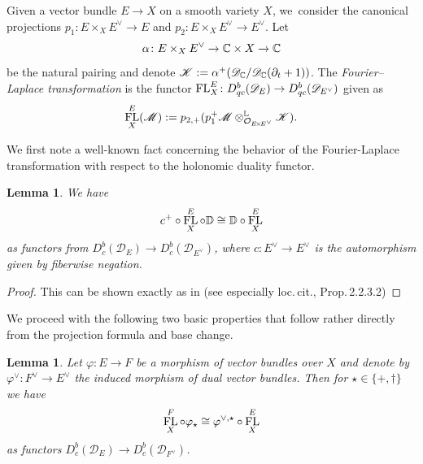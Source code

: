 \documentclass[11pt]{article}
\newtheorem{lem}[thm]{Lemma}
\newcommand{\bD}{{\mathbb D}}\let\mbd\bD
\newcommand{\cD}{\mathscr{D}}
\DeclareMathOperator{\FL}{\textup{FL}}
\newcommand\defstyle[1]{\emph{#1}}
\begin{document}
\begin{dfn}
Given a vector bundle $E \to X$ on a smooth variety $X$, we~consider the canonical projections $p_1 \colon E \times_X E^\vee \to E$ and $p_2 \colon E \times_X E^\vee \to E^\vee$. Let
\[
\alpha \colon E \times_X E^\vee \to {\mathbb C} \times X \to {\mathbb C}
\]
be the natural pairing and denote $\mathscr K := \alpha^+(\mathscr D_{\mathbb C}/\mathscr D_{\mathbb C}(\partial_t+1))$.
The \defstyle{Fourier--Laplace transformation} is the functor $\FL_X^E \colon D_{qc}^b(\mathscr D_E) \to D_{qc}^b(\mathscr D_{E^\vee})$ given as
\[
\FL_X^E(\mathscr M) := p_{2,+} (p_1^+ \mathscr M \otimes^{\mathbb L}_{\O_{E\!\times\!E^\vee}} \mathscr K).\qedhere
\]
\end{dfn}

We first note a well-known fact concerning the behavior of the Fourier-Laplace transformation with respect to the holonomic duality functor.

\begin{lem}\label{lem:DualFourier}
We have
\[
c^+ \circ \FL_X^E \circ \bD \cong \bD \circ \FL_X^E
\]
as functors from $D^b_c(\cD_E) \to D^b_c(\cD_{E^\vee})$,
where $c:E^\vee \to E^\vee$ is the
automorphism given by fiberwise negation.
\end{lem}

\begin{proof}
This can be shown exactly as in \cite[Cor.\,2.2.2.1., 4)]{Daia} (see especially loc.\,cit., Prop.\,2.2.3.2)
\end{proof}

We proceed with the following two basic properties that follow rather directly from the projection formula and base change.

\begin{lem} \label{lem:FLBundleMorphism}
Let $\varphi \colon E \to F$ be a morphism of vector bundles over $X$ and denote by $\varphi^\vee \colon F^\vee \to E^\vee$ the induced morphism of dual vector bundles. Then for $\star\in\{+,\dag\}$ we have
\[
\FL_X^F \circ \varphi_\star \cong \varphi^{\vee,\star} \circ \FL_X^E
\]
as functors $D_{c}^b(\mathscr D_E) \to D_{c}^b(\mathscr D_{F^\vee})$.
\end{lem}
\end{document}
